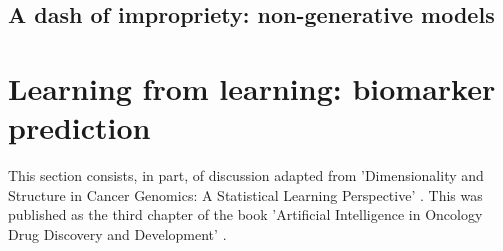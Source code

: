 \documentclass[../thesis.tex]{subfiles}
\begin{document}
\subsection{A dash of impropriety: non-generative models}

\section{Learning from learning: biomarker prediction}
This section consists, in part, of discussion adapted from 'Dimensionality and Structure in Cancer Genomics: A Statistical Learning Perspective' \citep{bradley_dimensionality_2020}. This was published as the third chapter of the book 'Artificial Intelligence in Oncology Drug Discovery and Development' \citep{cassidy_artificial_2020}.

\dobib %
\end{document}
